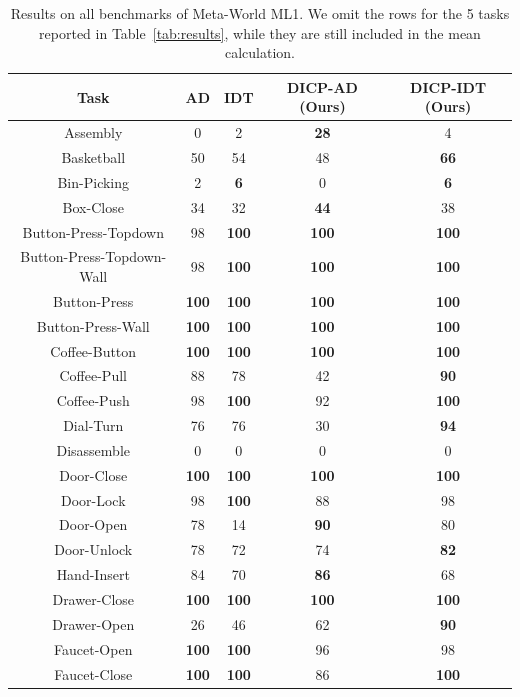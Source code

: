 \documentclass{article}
\begin{document}
\begin{table}[h]
    \caption{Results on all benchmarks of Meta-World ML1.
    We omit the rows for the 5 tasks reported in Table~\ref{tab:results}, while they are still included in the mean calculation.
    }
    \label{tab:results-all}
    \small \centering
    \begin{tabular}{ccccc}
    \toprule
    Task & AD & IDT & DICP-AD (Ours) & DICP-IDT (Ours)\\
    \midrule
    Assembly & 0 & 2 & \textbf{28} & 4\\
    Basketball & 50 & 54 & 48 & \textbf{66}\\
    Bin-Picking & 2 & \textbf{6} & 0 & \textbf{6}\\
    Box-Close & 34 & 32 & \textbf{44} & 38\\
    Button-Press-Topdown & 98 & \textbf{100} & \textbf{100} & \textbf{100}\\
    Button-Press-Topdown-Wall & 98 & \textbf{100} & \textbf{100} & \textbf{100}\\
    Button-Press & \textbf{100} & \textbf{100} & \textbf{100} & \textbf{100}\\
    Button-Press-Wall & \textbf{100} & \textbf{100} & \textbf{100} & \textbf{100}\\
    Coffee-Button & \textbf{100} & \textbf{100} & \textbf{100} & \textbf{100}\\
    Coffee-Pull & 88 & 78 & 42 & \textbf{90}\\
    Coffee-Push & 98 & \textbf{100} & 92 & \textbf{100}\\
    Dial-Turn & 76 & 76 & 30 & \textbf{94}\\
    Disassemble & 0 & 0 & 0 & 0\\
    Door-Close & \textbf{100} & \textbf{100} & \textbf{100} & \textbf{100}\\
    Door-Lock & 98 & \textbf{100} & 88 & 98\\
    Door-Open & 78 & 14 & \textbf{90} & 80\\
    Door-Unlock & 78 & 72 & 74 & \textbf{82}\\
    Hand-Insert & 84 & 70 & \textbf{86} & 68\\
    Drawer-Close & \textbf{100} & \textbf{100} & \textbf{100} & \textbf{100}\\
    Drawer-Open & 26 & 46 & 62 & \textbf{90}\\
    Faucet-Open & \textbf{100} & \textbf{100} & 96 & 98\\
    Faucet-Close & \textbf{100} & \textbf{100} & 86 & \textbf{100}\\

\end{tabular}
\end{table}
\end{document}

